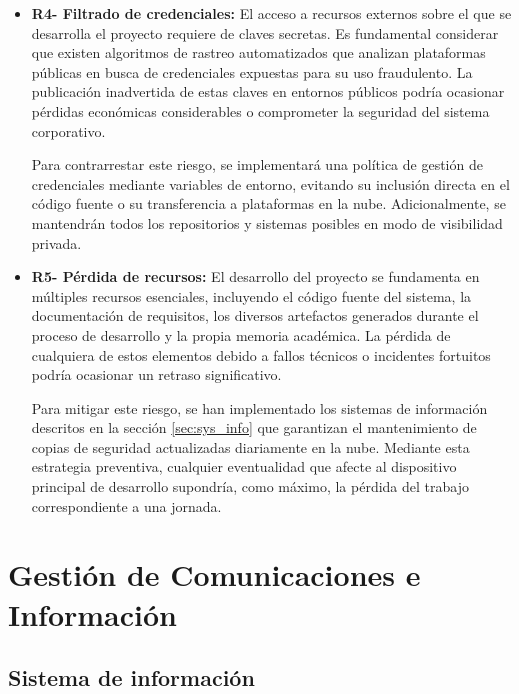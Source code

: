\begin{itemize}
\item\textbf{R4- Filtrado de credenciales: }El acceso a recursos externos sobre el que se desarrolla el proyecto requiere de claves secretas. Es fundamental considerar que existen algoritmos de rastreo automatizados que analizan plataformas públicas en busca de credenciales expuestas para su uso fraudulento. La publicación inadvertida de estas claves en entornos públicos podría ocasionar pérdidas económicas considerables o comprometer la seguridad del sistema corporativo.

Para contrarrestar este riesgo, se implementará una política de gestión de credenciales mediante variables de entorno, evitando su inclusión directa en el código fuente o su transferencia a plataformas en la nube. Adicionalmente, se mantendrán todos los repositorios y sistemas posibles en modo de visibilidad privada.

\item\textbf{R5- Pérdida de recursos: }El desarrollo del proyecto se fundamenta en múltiples recursos esenciales, incluyendo el código fuente del sistema, la documentación de requisitos, los diversos artefactos generados durante el proceso de desarrollo y la propia memoria académica. La pérdida de cualquiera de estos elementos debido a fallos técnicos o incidentes fortuitos podría ocasionar un retraso significativo.

Para mitigar este riesgo, se han implementado los sistemas de información descritos en la sección \ref{sec:sys_info} que garantizan el mantenimiento de copias de seguridad actualizadas diariamente en la nube. Mediante esta estrategia preventiva, cualquier eventualidad que afecte al dispositivo principal de desarrollo supondría, como máximo, la pérdida del trabajo correspondiente a una jornada.
\end{itemize}

\section{Gestión de Comunicaciones e Información}

\subsection{Sistema de información}\label{sec}

